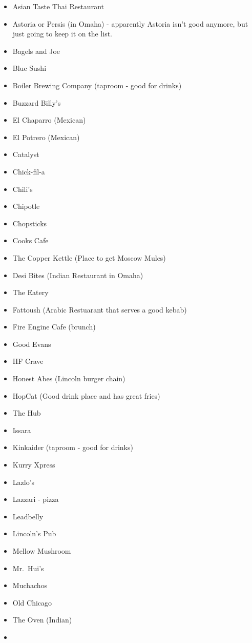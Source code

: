 \documentclass[
  12pt,
]{book}
\providecommand{\tightlist}{%
  \setlength{\itemsep}{0pt}\setlength{\parskip}{0pt}}
\begin{document}
\begin{itemize}
\tightlist
\item
  Asian Taste Thai Restaurant
\item
  Astoria or Persis (in Omaha) - apparently Astoria isn't good anymore, but just going to keep it on the list.
\item
  Bagels and Joe
\item
  Blue Sushi
\item
  Boiler Brewing Company (taproom - good for drinks)
\item
  Buzzard Billy's
\item
  El Chaparro (Mexican)
\item
  El Potrero (Mexican)
\item
  Catalyst
\item
  Chick-fil-a
\item
  Chili's
\item
  Chipotle
\item
  Chopsticks
\item
  Cooks Cafe
\item
  The Copper Kettle (Place to get Moscow Mules)
\item
  Desi Bites (Indian Restaurant in Omaha)
\item
  The Eatery
\item
  Fattoush (Arabic Restuarant that serves a good kebab)
\item
  Fire Engine Cafe (brunch)
\item
  Good Evans
\item
  HF Crave
\item
  Honest Abes (Lincoln burger chain)
\item
  HopCat (Good drink place and has great fries)
\item
  The Hub
\item
  Issara
\item
  Kinkaider (taproom - good for drinks)
\item
  Kurry Xpress
\item
  Lazlo's
\item
  Lazzari - pizza
\item
  Leadbelly
\item
  Lincoln's Pub
\item
  Mellow Mushroom
\item
  Mr.~Hui's
\item
  Muchachos
\item
  Old Chicago
\item
  The Oven (Indian)
\item

\end{itemize}
\end{document}
